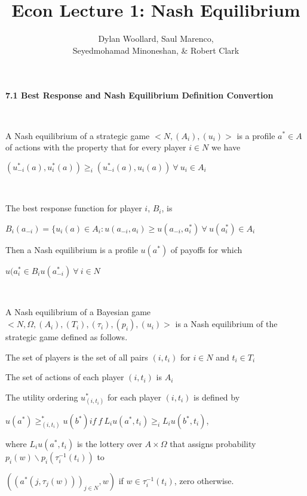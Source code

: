 \documentclass{homework}
\title{Econ Lecture 1: Nash Equilibrium}
\author{Dylan Woollard, Saul Marenco, \\ Seyedmohamad Minoneshan, \& Robert Clark}
\begin{document}
\maketitle

\centerline{\Large\textbf{7.1 Best Response and Nash Equilibrium Definition Convertion}}

\Definition[2.1]\ 

A Nash equilibrium of a strategic game $<N, (A_{i}), (u_{i})>$ is a profile $a^\ast \in A$ of actions with the property that for every player $i \in N$ we have\ 

$(u^\ast _{-i}(a), u^\ast _{i}(a)) \geq _{i} (u^\ast _{-i}(a), u_{i}(a)) \: \forall \:u_{i}  \in  A_{i}$

\Definition[2.2]\ 

The best response function for player $i$, $B_{i}$, is \ 

\indent\hspace{18pt}$B_{i}(a_{-i})=\{ u_{i}(a) \in A_{i} : u(a_{-i}, a_{i}) \geq u(a_{-i}, a_{i}^\ast)  \: \forall \:u(a_{i}^\ast)  \in  A_{i}$ \ 

Then a Nash equilibrium is a profile $u(a^\ast)$ of payoffs for which  \ 

\indent\hspace{18pt}$u(a_{i}^\ast \in B_{i}u(a_{-i}^\ast) \: \forall \: i \in N$

\Definition[6.2]\ 

A Nash equilibrium of a Bayesian game $<N, \Omega, (A_{i}), (T_{i}), (\tau _{i}), (p_{i}), (u_{i})>$ is a Nash equilibrium of the strategic game defined as follows.\ 

The set of players is the set of all pairs $(i, t_{i})$ for $i \in N$ and $t_{i} \in T_{i}$\ 

The set of actions of each player $(i, t_{i})$ is $A_{i}$\

The utility ordering $u_{(i,t_{i})}^\ast$ for each player $(i, t_{i})$ is defined by\ 

\indent\hspace{18pt}$u(a^\ast) \geq_{(i,t_{i})}^\ast u(b^\ast) if \: f \: L_{i} u(a^\ast,t_{i}) \geq_{i} L_{i} u(b^\ast,t_{i})$,\ 

where $L_{i} u(a^\ast,t_{i})$ is the lottery over $A \times \Omega$ that assigns probability $p_{i}(w)\backslash p_{i}(\tau_{i}^{-1}(t_{i}))$ to\

$((a^\ast(j,\tau_{j}(w)))_{j\in N},w)$ if $w \in \tau_{i}^{-1}(t_{i})$, zero otherwise.\\
\end{document}
